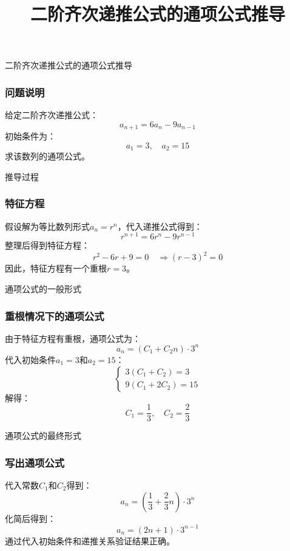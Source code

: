 \documentclass[aspectratio=169]{ctexbeamer} %
\begin{document}
\begin{frame}
\title{二阶齐次递推公式的通项公式推导}
\titlepage
\end{frame}

\begin{frame}{二阶齐次递推公式的通项公式推导}
\frametitle{问题说明}
给定二阶齐次递推公式：
\[
a_{n+1} = 6a_n - 9a_{n-1}
\]
初始条件为：
\[
a_1 = 3, \quad a_2 = 15
\]
求该数列的通项公式。

\end{frame}

\begin{frame}{推导过程}
\frametitle{特征方程}
假设解为等比数列形式$a_n = r^n$，代入递推公式得到：
\[
r^{n+1} = 6r^n - 9r^{n-1}
\]
整理后得到特征方程：
\[
r^2 - 6r + 9 = 0 \quad \Rightarrow (r - 3)^2 = 0
\]
因此，特征方程有一个重根$r = 3$。
\end{frame}

\begin{frame}{通项公式的一般形式}
\frametitle{重根情况下的通项公式}
由于特征方程有重根，通项公式为：
\[
a_n = (C_1 + C_2 n) \cdot 3^n
\]
代入初始条件$a_1 = 3$和$a_2 = 15$：
\[
\begin{cases}
3(C_1 + C_2) = 3 \\
9(C_1 + 2C_2) = 15
\end{cases}
\]
解得：
\[
C_1 = \frac{1}{3}, \quad C_2 = \frac{2}{3}
\]

\end{frame}

\begin{frame}{通项公式的最终形式}
\frametitle{写出通项公式}
代入常数$C_1$和$C_2$得到：
\[
a_n = \left( \frac{1}{3} + \frac{2}{3}n \right) \cdot 3^n
\]
化简后得到：
\[
a_n = (2n + 1) \cdot 3^{n-1}
\]
通过代入初始条件和递推关系验证结果正确。
\end{frame}
\end{document}
